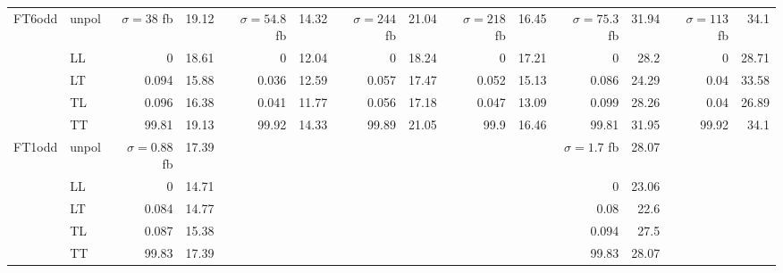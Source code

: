 \begin{table}[h]
{\begin{tabular}{llrrrrrrrrrrrr}
\midrule
\multirow{5}{*}{FT6odd}
 & unpol & $\sigma = \num{38}$ fb & \num{19.12} & $\sigma = \num{54.8}$ fb & \num{14.32} & $\sigma = \num{244}$ fb & \num{21.04} & $\sigma = \num{218}$ fb & \num{16.45} & $\sigma = \num{75.3}$ fb & \num{31.94} & $\sigma = \num{113}$ fb & \num{34.1} \\
 & LL & \num{0} & \num{18.61} & \num{0} & \num{12.04} & \num{0} & \num{18.24} & \num{0} & \num{17.21} & \num{0} & \num{28.2} & \num{0} & \num{28.71} \\
 & LT & \num{0.094} & \num{15.88} & \num{0.036} & \num{12.59} & \num{0.057} & \num{17.47} & \num{0.052} & \num{15.13} & \num{0.086} & \num{24.29} & \num{0.04} & \num{33.58} \\
 & TL & \num{0.096} & \num{16.38} & \num{0.041} & \num{11.77} & \num{0.056} & \num{17.18} & \num{0.047} & \num{13.09} & \num{0.099} & \num{28.26} & \num{0.04} & \num{26.89} \\
 & TT & \num{99.81} & \num{19.13} & \num{99.92} & \num{14.33} & \num{99.89} & \num{21.05} & \num{99.9} & \num{16.46} & \num{99.81} & \num{31.95} & \num{99.92} & \num{34.1} \\
\midrule
\multirow{5}{*}{FT1odd}
 & unpol & $\sigma = \num{0.88}$ fb & \num{17.39} &  &  &  &  &  &  & $\sigma = \num{1.7}$ fb & \num{28.07} &  &  \\
 & LL & \num{0} & \num{14.71} &  &  &  &  &  &  & \num{0} & \num{23.06} &  &  \\
 & LT & \num{0.084} & \num{14.77} &  &  &  &  &  &  & \num{0.08} & \num{22.6} &  &  \\
 & TL & \num{0.087} & \num{15.38} &  &  &  &  &  &  & \num{0.094} & \num{27.5} &  &  \\
 & TT & \num{99.83} & \num{17.39} &  &  &  &  &  &  & \num{99.83} & \num{28.07} &  &  \\
\bottomrule
\end{tabular}
}%
\end{table}